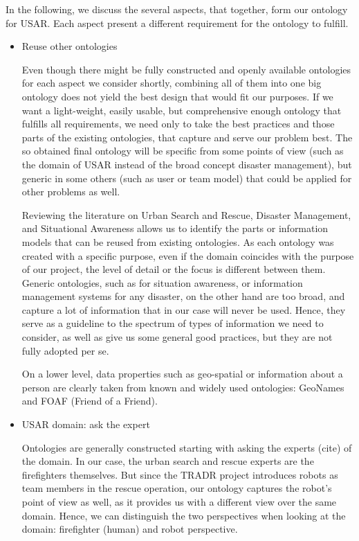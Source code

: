 In the following, we discuss the several aspects, that together, form our ontology for USAR. Each aspect present a different requirement for the ontology to fulfill. 
\begin{itemize}
\item Reuse other ontologies

Even though there might be fully constructed and openly available ontologies for each aspect we consider shortly, combining all of them into one big ontology does not yield the best design that would fit our purposes. If we want a light-weight, easily usable, but comprehensive enough ontology that fulfills all requirements, we need only to take the best practices and those parts of the existing ontologies, that capture and serve our problem best. The so obtained final ontology will be specific from some points of view (such as the domain of USAR instead of the broad concept disaster management), but generic in some others (such as user or team model) that could be applied for other problems as well.

Reviewing the literature on Urban Search and Rescue, Disaster Management, and Situational Awareness allows us to identify the parts or information models that can be reused from existing ontologies. As each ontology was created with a specific purpose, even if the domain coincides with the purpose of our project, the level of detail or the focus is different between them. Generic ontologies, such as for situation awareness, or information management systems for any disaster, on the other hand are too broad, and capture a lot of information that in our case will never be used. Hence, they serve as a guideline to the spectrum of types of information we need to consider, as well as give us some general good practices, but they are not fully adopted per se. 

On a lower level, data properties such as geo-spatial or information about a person are clearly taken from known and widely used ontologies: GeoNames and FOAF (Friend of a Friend). 


\item USAR domain: ask the expert 

Ontologies are generally constructed starting with asking the experts (cite) of the domain. In our case, the urban search and rescue experts are the firefighters themselves. But since the TRADR project introduces robots as team members in the rescue operation, our ontology captures the robot's point of view as well, as it provides us with a different view over the same domain. Hence, we can distinguish the two perspectives when looking at the domain: firefighter (human) and robot perspective.
\begin{itemize}


\end{itemize}
\end{itemize}
